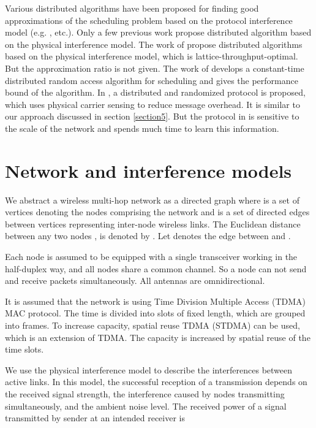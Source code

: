 \documentclass[conference]{IEEEtran}
\begin{document}
Various distributed algorithms have been proposed for finding good
approximations of the scheduling problem based on the protocol
interference model (e.g.
\cite{chaporkar2005throughput,lin2005impact,modiano2006maximizing },
etc.). Only a few previous work propose distributed algorithm based
on the physical interference model. The work of
\cite{yi2007optimal,yi-mac,yi2006learning} propose distributed
algorithms based on the physical interference model, which is
lattice-throughput-optimal. But the approximation ratio is not
given. The work of \cite{joo2007performance} develops a
constant-time distributed random access algorithm for scheduling and
gives the performance bound of the algorithm. In
\cite{scheideler2008log}, a distributed and randomized protocol is
proposed, which uses physical carrier sensing to reduce message
overhead. It is similar to our approach discussed in section
\ref{section5}. But the protocol in \cite{scheideler2008log} is
sensitive to the scale of the network and spends much time to learn
this information.

\section{Network and interference models}\label{section3}
We abstract a wireless multi-hop network as a directed graph
 where  is a set of vertices denoting the nodes
comprising the network and  is a set of directed edges between
vertices representing inter-node wireless links. The Euclidean
distance between any two nodes , is denoted by
. Let  denotes the edge between 
and .

Each node is assumed to be equipped with a single transceiver
working in the half-duplex way, and all nodes share a common
channel. So a node can not send and receive packets simultaneously.
All antennas  are omnidirectional.

It is assumed that the network is using Time Division Multiple
Access (TDMA) MAC protocol. The time is divided into slots of fixed
length, which are grouped into frames. To increase capacity, spatial
reuse TDMA (STDMA) \cite{nelson1985stc} can be used, which is an
extension of TDMA. The capacity is increased by spatial reuse of the
time slots.

We use the physical interference model \cite{gupta2000cwn} to
describe the interferences between active links. In this model, the
successful reception of a transmission depends on the received
signal strength, the interference caused by nodes transmitting
simultaneously, and the ambient noise level. The received power
 of a signal transmitted by sender  at an
intended receiver  is
\end{document}
